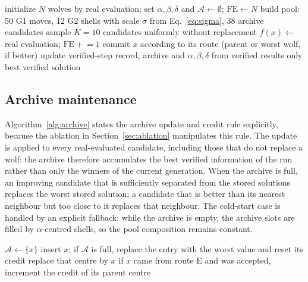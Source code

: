 \documentclass[11pt,a4paper]{article}
\newcommand{\method}{VAST-GWO}
\newcommand{\arc}{\mathcal{A}}
\begin{document}
\begin{algorithm}[t]
\caption{\method{} (one run)}
\label{alg:vast}
\begin{algorithmic}[1]
\State initialize $N$ wolves by real evaluation; set
$\alpha,\beta,\delta$ and $\arc\!\leftarrow\!\emptyset$;
$\mathrm{FE}\!\leftarrow\!N$
  \State build pool: 50 G1 moves, 12 G2 shells with scale
  $\sigma$ from Eq.~\eqref{eq:sigma}, 38 archive candidates
  \State sample $K=10$ candidates uniformly without replacement
     \State $f(x)\leftarrow$ real evaluation; $\mathrm{FE}\!\mathrel{+}\!=\!1$
     \State commit $x$ according to its route (parent or worst wolf, if
     better)
     \State update verified-step record, archive and
     $\alpha,\beta,\delta$ from verified results only
  \EndFor
\EndWhile
\State \Return best verified solution
\end{algorithmic}
\end{algorithm}

\subsection{Archive maintenance}
Algorithm~\ref{alg:archive} states the archive update and credit rule
explicitly, because the ablation in Section~\ref{sec:ablation} manipulates
this rule. The update is applied to every real-evaluated candidate, including
those that do not replace a wolf: the archive therefore accumulates the best
verified information of the run rather than only the winners of the current
generation. When the archive is full, an improving candidate that is
sufficiently separated from the stored solutions replaces the worst stored
solution; a candidate that is better than its nearest neighbour but too close
to it replaces that neighbour. The cold-start case is handled by an explicit
fallback: while the archive is empty, the archive slots are filled by
$\alpha$-centred shells, so the pool composition remains constant.

\begin{algorithm}[t]
\caption{Archive update (applied to every verified candidate $x$, value $v$)}
\label{alg:archive}
\begin{algorithmic}[1]
\If{$\arc=\emptyset$}
   \State $\arc\leftarrow\{x\}$
\ElsIf{$v<\max$ value in $\arc$}
      \State insert $x$; if $\arc$ is full, replace the entry with the
      worst value and reset its credit
      \State replace that centre by $x$
   \EndIf
\EndIf
\State if $x$ came from route E and was accepted, increment the credit of its
parent centre
\end{algorithmic}
\end{algorithm}
\end{document}
